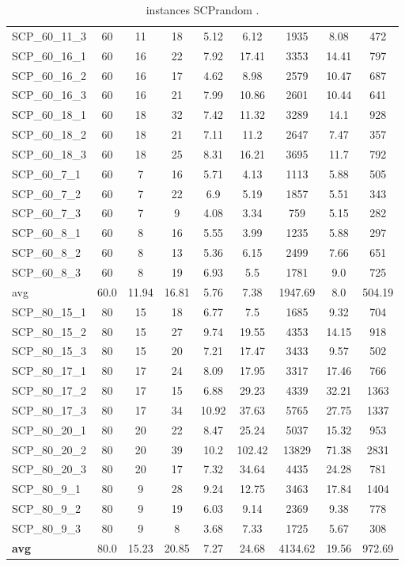 \begin{table}[!ht]
{\begin{tabular}{lcccccccc}
SCP\_60\_11\_3 & 60 & 11 & 18 & 5.12 & 6.12 & 1935 & 8.08 & 472 \\
SCP\_60\_16\_1 & 60 & 16 & 22 & 7.92 & 17.41 & 3353 & 14.41 & 797 \\
SCP\_60\_16\_2 & 60 & 16 & 17 & 4.62 & 8.98 & 2579 & 10.47 & 687 \\
SCP\_60\_16\_3 & 60 & 16 & 21 & 7.99 & 10.86 & 2601 & 10.44 & 641 \\
SCP\_60\_18\_1 & 60 & 18 & 32 & 7.42 & 11.32 & 3289 & 14.1 & 928 \\
SCP\_60\_18\_2 & 60 & 18 & 21 & 7.11 & 11.2 & 2647 & 7.47 & 357 \\
SCP\_60\_18\_3 & 60 & 18 & 25 & 8.31 & 16.21 & 3695 & 11.7 & 792 \\
SCP\_60\_7\_1 & 60 & 7 & 16 & 5.71 & 4.13 & 1113 & 5.88 & 505 \\
SCP\_60\_7\_2 & 60 & 7 & 22 & 6.9 & 5.19 & 1857 & 5.51 & 343 \\
SCP\_60\_7\_3 & 60 & 7 & 9 & 4.08 & 3.34 & 759 & 5.15 & 282 \\
SCP\_60\_8\_1 & 60 & 8 & 16 & 5.55 & 3.99 & 1235 & 5.88 & 297 \\
SCP\_60\_8\_2 & 60 & 8 & 13 & 5.36 & 6.15 & 2499 & 7.66 & 651 \\
SCP\_60\_8\_3 & 60 & 8 & 19 & 6.93 & 5.5 & 1781 & 9.0 & 725 \\
\hline avg & 60.0 & 11.94 & 16.81& 5.76 & 7.38& 1947.69 & 8.0& 504.19\\ \hline
SCP\_80\_15\_1 & 80 & 15 & 18 & 6.77 & 7.5 & 1685 & 9.32 & 704 \\
SCP\_80\_15\_2 & 80 & 15 & 27 & 9.74 & 19.55 & 4353 & 14.15 & 918 \\
SCP\_80\_15\_3 & 80 & 15 & 20 & 7.21 & 17.47 & 3433 & 9.57 & 502 \\
SCP\_80\_17\_1 & 80 & 17 & 24 & 8.09 & 17.95 & 3317 & 17.46 & 766 \\
SCP\_80\_17\_2 & 80 & 17 & 15 & 6.88 & 29.23 & 4339 & 32.21 & 1363 \\
SCP\_80\_17\_3 & 80 & 17 & 34 & 10.92 & 37.63 & 5765 & 27.75 & 1337 \\
SCP\_80\_20\_1 & 80 & 20 & 22 & 8.47 & 25.24 & 5037 & 15.32 & 953 \\
SCP\_80\_20\_2 & 80 & 20 & 39 & 10.2 & 102.42 & 13829 & 71.38 & 2831 \\
SCP\_80\_20\_3 & 80 & 20 & 17 & 7.32 & 34.64 & 4435 & 24.28 & 781 \\
SCP\_80\_9\_1 & 80 & 9 & 28 & 9.24 & 12.75 & 3463 & 17.84 & 1404 \\
SCP\_80\_9\_2 & 80 & 9 & 19 & 6.03 & 9.14 & 2369 & 9.38 & 778 \\
SCP\_80\_9\_3 & 80 & 9 & 8 & 3.68 & 7.33 & 1725 & 5.67 & 308 \\
\hline \textbf{avg} & 80.0 & 15.23 & 20.85 & 7.27 & 24.68 & 4134.62 & 19.56 & 972.69 \\ \hline
\bottomrule
\end{tabular}
}%
\caption{ instances SCPrandom .}
\label{tab:table_compareBB_SCPrandom }
\end{table}
